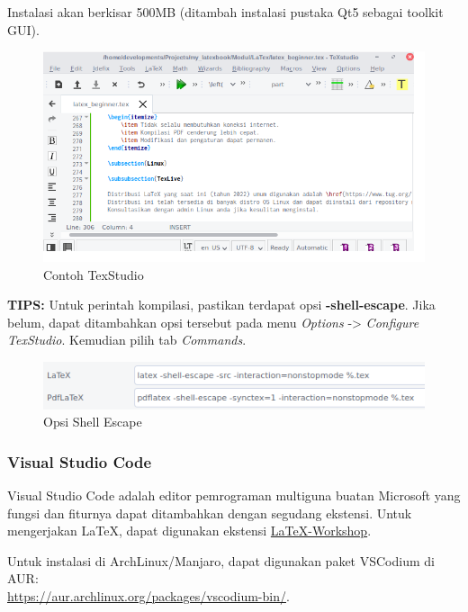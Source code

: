 \documentclass{book} %
\begin{document}
	Instalasi akan berkisar 500MB (ditambah instalasi pustaka Qt5 sebagai toolkit GUI).

	\newpage
	\begin{figure}[!ht]
		\centering
		\includegraphics[width=400pt]{images/texstudio}
		\caption{Contoh TexStudio}
	\end{figure}

	\textbf{TIPS:} Untuk perintah kompilasi, pastikan terdapat opsi \textbf{-shell-escape}.
	Jika belum, dapat ditambahkan opsi tersebut pada menu \textit{Options} -> \textit{Configure TexStudio}.
	Kemudian pilih tab \textit{Commands}.

	\begin{figure}[!ht]
		\centering
		\includegraphics[width=450pt]{images/texstudio_shellescape}
		\caption{Opsi Shell Escape}
	\end{figure}

	\subsubsection{Visual Studio Code}

	Visual Studio Code adalah editor pemrograman multiguna buatan Microsoft yang fungsi dan fiturnya dapat ditambahkan dengan segudang ekstensi.
	Untuk mengerjakan \LaTeX{}, dapat digunakan ekstensi \href{https://github.com/James-Yu/LaTeX-Workshop}{LaTeX-Workshop}.

	Untuk instalasi di ArchLinux/Manjaro, dapat digunakan paket VSCodium di AUR:\\
	\url{https://aur.archlinux.org/packages/vscodium-bin/}.
\end{document}
